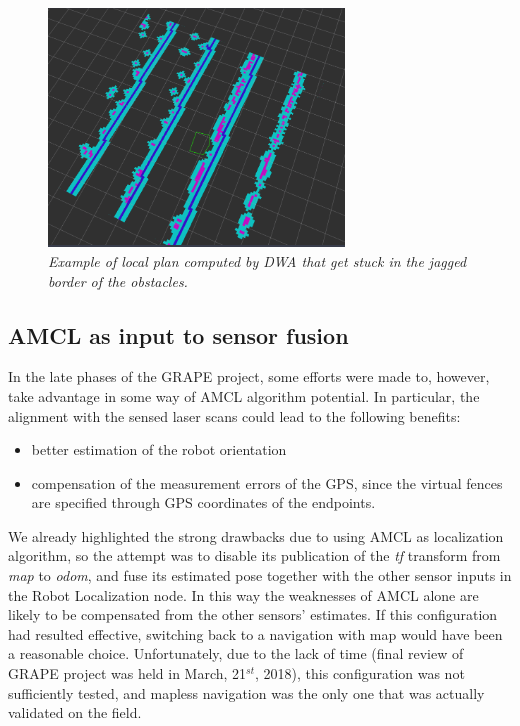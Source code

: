 \begin{figure}
	\centering
	\includegraphics[width=0.7\textwidth]{Images/localization/localCostmap_stuck.png}
	\caption{\textit{Example of local plan computed by DWA that get stuck in the jagged border of the obstacles.}}
	\label{fig:dwaStuck}
\end{figure}

\subsection{AMCL as input to sensor fusion}\label{subsec:AMCLinSensorFusion}
In the late phases of the \ac{GRAPE} project, some efforts were made to, however, take advantage in some way of \ac{AMCL} algorithm potential. In particular, the alignment with the sensed laser scans could lead to the following benefits:
\begin{itemize}
	\item better estimation of the robot orientation 
	\item compensation of the measurement errors of the GPS, since the virtual fences are specified through GPS coordinates of the endpoints.
\end{itemize}

We already highlighted the strong drawbacks due to using \ac{AMCL} as localization algorithm, so the attempt was to disable its publication of the \textit{tf} transform from \textit{map} to \textit{odom}, and fuse its estimated pose together with the other sensor inputs in the Robot Localization node. In this way the weaknesses of \ac{AMCL} alone are likely to be compensated from the other sensors' estimates. If this configuration had resulted effective, switching back to a navigation with map would have been a reasonable choice. Unfortunately, due to the lack of time (final review of \ac{GRAPE} project was held in March, 21$^{st}$, 2018), this configuration was not sufficiently tested, and mapless navigation was the only one that was actually validated on the field. 

